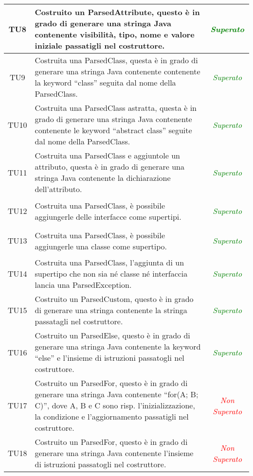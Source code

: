 \begin{longtable}{|c|>{}m{8cm}|c|}
\hypertarget{TU8}{TU8} & Costruito un ParsedAttribute, questo è in grado di generare una stringa Java contenente visibilità, tipo, nome e valore iniziale passatigli nel costruttore. & \textcolor{Green}{\textit{Superato}}\\ \hline
\hypertarget{TU9}{TU9} & Costruita una ParsedClass, questa è in grado di generare una stringa Java contenente contenente la keyword ``class'' seguita dal nome della ParsedClass. & \textcolor{Green}{\textit{Superato}}\\ \hline
\hypertarget{TU10}{TU10} & Costruita una ParsedClass astratta, questa è in grado di generare una stringa Java contenente contenente le keyword ``abstract class'' seguite dal nome della ParsedClass. & \textcolor{Green}{\textit{Superato}}\\ \hline
\hypertarget{TU11}{TU11} & Costruita una ParsedClass e aggiuntole un attributo, questa è in grado di generare una stringa Java contenente la dichiarazione dell'attributo. & \textcolor{Green}{\textit{Superato}}\\ \hline
\hypertarget{TU12}{TU12} & Costruita una ParsedClass, è possibile aggiungerle delle interfacce come supertipi. & \textcolor{Green}{\textit{Superato}}\\ \hline
\hypertarget{TU13}{TU13} & Costruita una ParsedClass, è possibile aggiungerle una classe come supertipo. & \textcolor{Green}{\textit{Superato}}\\ \hline
\hypertarget{TU14}{TU14} & Costruita una ParsedClass, l'aggiunta di un supertipo che non sia né classe né interfaccia lancia una ParsedException. & \textcolor{Green}{\textit{Superato}}\\ \hline
\hypertarget{TU15}{TU15} & Costruito un ParsedCustom, questo è in grado di generare una stringa contenente la stringa passatagli nel costruttore. & \textcolor{Green}{\textit{Superato}}\\ \hline
\hypertarget{TU16}{TU16} & Costruito un ParsedElse, questo è in grado di generare una stringa Java contenente la keyword ``else'' e l'insieme di istruzioni passatogli nel costruttore. & \textcolor{Green}{\textit{Superato}}\\ \hline
\hypertarget{TU17}{TU17} & Costruito un ParsedFor, questo è in grado di generare una stringa Java contenente ``for(A; B; C)'', dove A, B e C sono risp. l'inizializzazione, la condizione e l'aggiornamento passatigli nel costruttore. & \textcolor{Red}{\textit{Non Superato}}\\ \hline
\hypertarget{TU18}{TU18} & Costruito un ParsedFor, questo è in grado di generare una stringa Java contenente l'insieme di istruzioni passatogli nel costruttore. & \textcolor{Red}{\textit{Non Superato}}\\ \hline

\end{longtable}
